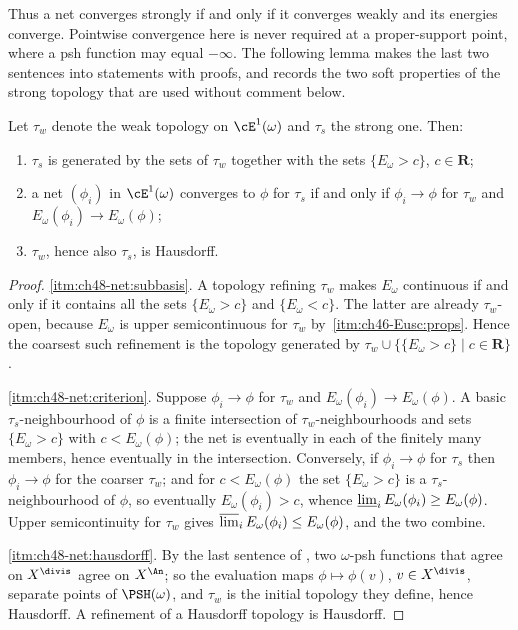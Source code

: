 Thus a net converges strongly if and only if it converges weakly and its
energies converge.  Pointwise convergence here is never required at a
proper-support point, where a psh function may equal $-\infty$.  The
following lemma makes the last two sentences into statements with proofs,
and records the two soft properties of the strong topology that are used
without comment below.

\begin{lemma}
\label{lem:ch48-net-criterion}
Let $\tau_w$ denote the weak topology on $\cE^1(\omega)$ and $\tau_s$
the strong one.  Then:
\begin{enumerate}
\item\label{itm:ch48-net:subbasis}
      $\tau_s$ is generated by the sets of $\tau_w$ together with the
      sets $\{E_\omega>c\}$, $c\in\mathbf R$;
\item\label{itm:ch48-net:criterion}
      a net $(\phi_i)$ in $\cE^1(\omega)$ converges to $\phi$ for
      $\tau_s$ if and only if $\phi_i\to\phi$ for $\tau_w$ and
      $E_\omega(\phi_i)\to E_\omega(\phi)$;
\item\label{itm:ch48-net:hausdorff}
      $\tau_w$, hence also $\tau_s$, is Hausdorff.
\end{enumerate}
\end{lemma}

\begin{proof}
\cref{itm:ch48-net:subbasis}.  A topology refining $\tau_w$ makes
$E_\omega$ continuous if and only if it contains all the sets
$\{E_\omega>c\}$ and $\{E_\omega<c\}$.  The latter are already
$\tau_w$-open, because $E_\omega$ is upper semicontinuous for $\tau_w$
by \,\cref{itm:ch46-Eusc:props}.  Hence the
coarsest such refinement is the topology generated by
$\tau_w\cup\{\{E_\omega>c\}\mid c\in\mathbf R\}$.

\cref{itm:ch48-net:criterion}.  Suppose $\phi_i\to\phi$ for $\tau_w$ and
$E_\omega(\phi_i)\to E_\omega(\phi)$.  A basic $\tau_s$-neighbourhood of
$\phi$ is a finite intersection of $\tau_w$-neighbourhoods and sets
$\{E_\omega>c\}$ with $c<E_\omega(\phi)$; the net is eventually in each
of the finitely many members, hence eventually in the intersection.
Conversely, if $\phi_i\to\phi$ for $\tau_s$ then $\phi_i\to\phi$ for
the coarser $\tau_w$; and for $c<E_\omega(\phi)$ the set
$\{E_\omega>c\}$ is a $\tau_s$-neighbourhood of $\phi$, so
eventually $E_\omega(\phi_i)>c$, whence
$\varliminf_iE_\omega(\phi_i)\ge E_\omega(\phi)$.  Upper semicontinuity
for $\tau_w$ gives $\varlimsup_iE_\omega(\phi_i)\le E_\omega(\phi)$, and
the two combine.

\cref{itm:ch48-net:hausdorff}.  By the last sentence of
, two $\omega$-psh functions that agree
on $X^{\divis}$ agree on $X^{\An}$; so the evaluation maps
$\phi\mapsto\phi(v)$, $v\in X^{\divis}$, separate points of
$\PSH(\omega)$, and $\tau_w$ is the initial topology they define, hence
Hausdorff.  A refinement of a Hausdorff topology is Hausdorff.
\end{proof}

